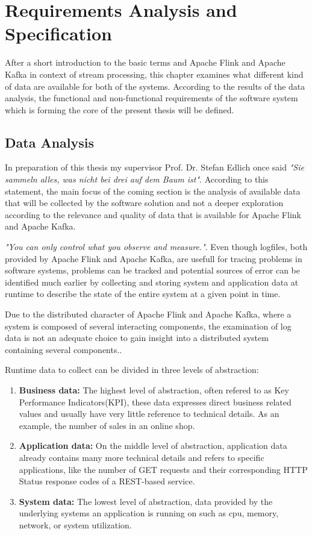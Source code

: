 \chapter{Requirements Analysis and Specification}

After a short introduction to the basic terms and Apache Flink and Apache Kafka in
context of stream processing, this chapter examines what different kind of data are available
for both of the systems. According to the results of the data analysis, the functional and
non-functional requirements of the software system which is forming the core of the present
thesis will be defined.

\section{Data Analysis}

In preparation of this thesis my supervisor Prof. Dr. Stefan Edlich once said \textit{"Sie sammeln
alles, was nicht bei drei auf dem Baum ist"}. According to this statement, the main focus
of the coming section is the analysis of available data that will be collected by the software
solution and not a deeper exploration according to the relevance and quality of data that
is available for Apache Flink and Apache Kafka.

\textit{"You can only control what you observe and measure."}\cite{Ebert07}. Even though logfiles, both
provided by Apache Flink and Apache Kafka, are usefull for tracing problems in software
systems, problems can be tracked and potential sources of error can be identified much
earlier by collecting and storing system and application data at runtime to describe the
state of the entire system at a given point in time.

Due to the distributed character of Apache Flink and Apache Kafka, where a system is
composed of several interacting components, the examination of log data is not an
adequate choice to gain insight into a distributed system containing several components.\cite{VanL14}.

Runtime data to collect can be divided in three levels of abstraction:

\begin{enumerate}
    \item \textbf{Business data:} The highest level of abstraction, often refered to as Key Performance
    Indicators(KPI), these data expresses direct business related values and
    usually have very little reference to technical details. As an example, the number of
    sales in an online shop.
    \item \textbf{Application data:} On the middle level of abstraction, application data already
    contains many more technical details and refers to specific applications, like the
    number of GET requests and their corresponding HTTP Status response codes of a
    REST-based service.
    \item \textbf{System data:} The lowest level of abstraction, data provided by the underlying
    systems an application is running on such as cpu, memory, network, or system utilization.
\end{enumerate}

